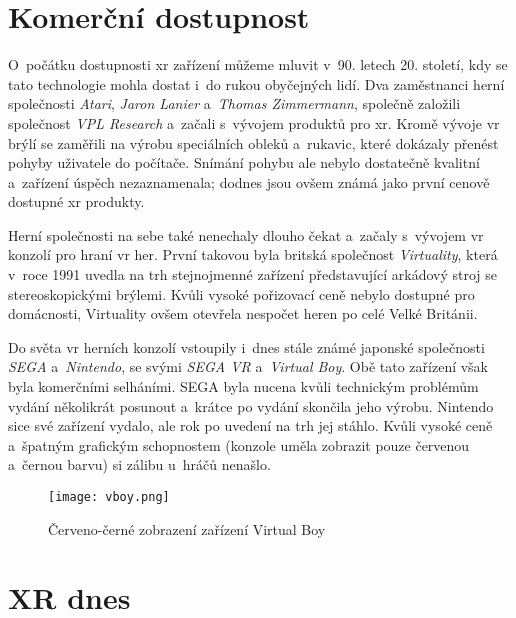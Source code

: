 \section{Komerční dostupnost}

O~počátku dostupnosti \gls{xr} zařízení můžeme mluvit v~90. letech 20. století, kdy se tato technologie mohla dostat i~do rukou obyčejných lidí. Dva zaměstnanci herní společnosti \textit{Atari}, \textit{Jaron Lanier} a~\textit{Thomas Zimmermann}, společně založili společnost \textit{VPL Research} a~začali s~vývojem produktů pro \gls{xr}. Kromě vývoje \gls{vr} brýlí se zaměřili na výrobu speciálních obleků a~rukavic, které dokázaly přenést pohyby uživatele do počítače. Snímání pohybu ale nebylo dostatečně kvalitní a~zařízení úspěch nezaznamenala; dodnes jsou ovšem známá jako první cenově dostupné \gls{xr} produkty. \cite{otechnice_2}

Herní společnosti na sebe také nenechaly dlouho čekat a~začaly s~vývojem \gls{vr} konzolí pro hraní \gls{vr} her. První takovou byla britská společnost \textit{Virtuality}, která v~roce 1991 uvedla na trh stejnojmenné zařízení představující arkádový stroj se stereoskopickými brýlemi. Kvůli vysoké pořizovací ceně nebylo dostupné pro domácnosti, Virtuality ovšem otevřela nespočet heren po celé Velké Británii. \cite{otechnice_2} \cite{independent_virtuality}

Do světa \gls{vr} herních konzolí vstoupily i~dnes stále známé japonské společnosti \textit{SEGA} a~\textit{Nintendo}, se svými \textit{SEGA VR} a~\textit{Virtual Boy}. Obě tato zařízení však byla komerčními selháními. SEGA byla nucena kvůli technickým problémům vydání několikrát posunout a~krátce po vydání skončila jeho výrobu. Nintendo sice své zařízení vydalo, ale rok po uvedení na trh jej stáhlo. Kvůli vysoké ceně a~špatným grafickým schopnostem (konzole uměla zobrazit pouze červenou a~černou barvu) si zálibu u~hráčů nenašlo.\cite{otechnice_2}

\begin{figure}[H]
    \centering
    \texttt{[image: vboy.png]}
    \caption{Červeno-černé zobrazení zařízení Virtual Boy \cite{vboy}}
    \label{vboy_red_display}
\end{figure}

\section{XR dnes}

